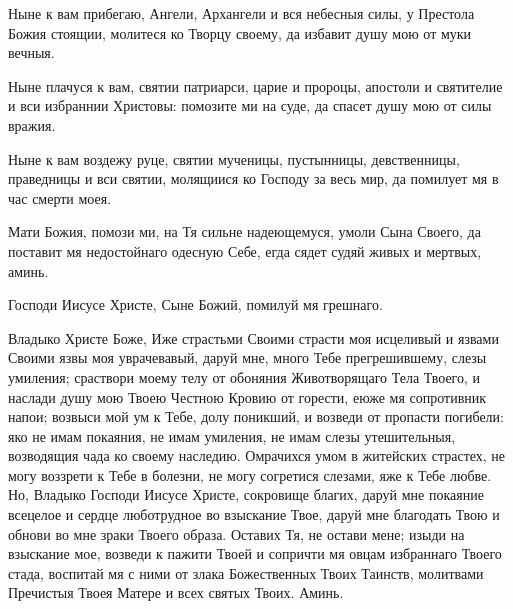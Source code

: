 \begin{mymulticols}

Ныне к вам прибегаю, Ангели, Архангели и вся небесныя силы, у Престола Божия стоящии, молитеся ко Творцу своему, да избавит душу мою от муки вечныя.


Ныне плачуся к вам, святии патриарси, царие и пророцы, апостоли и святителие и вси избраннии Христовы: помозите ми на суде, да спасет душу мою от силы вражия.

\slava

Ныне к вам воздежу руце, святии мученицы, пустынницы, девственницы, праведницы и вси святии, молящиися ко Господу за весь мир, да помилует мя в час смерти моея.

\inyne

Мати Божия, помози ми, на Тя сильне надеющемуся, умоли Сына Своего, да поставит мя недостойнаго одесную Себе, егда сядет судяй живых и мертвых, аминь.


Господи Иисусе Христе, Сыне Божий, помилуй мя грешнаго.

Владыко Христе Боже, Иже страстьми Своими страсти моя исцеливый и язвами Своими язвы моя уврачевавый, даруй мне, много Тебе прегрешившему, слезы умиления; сраствори моему телу от обоняния Животворящаго Тела Твоего, и наслади душу мою Твоею Честною Кровию от горести, еюже мя сопротивник напои; возвыси мой ум к Тебе, долу поникший, и возведи от пропасти погибели: яко не имам покаяния, не имам умиления, не имам слезы утешительныя, возводящия чада ко своему наследию. Омрачихся умом в житейских страстех, не могу воззрети к Тебе в болезни, не могу согретися слезами, яже к Тебе любве. Но, Владыко Господи Иисусе Христе, сокровище благих, даруй мне покаяние всецелое и сердце люботрудное во взыскание Твое, даруй мне благодать Твою и обнови во мне зраки Твоего образа. Оставих Тя, не остави мене; изыди на взыскание мое, возведи к пажити Твоей и сопричти мя овцам избраннаго Твоего стада, воспитай мя с ними от злака Божественных Твоих Таинств, молитвами Пречистыя Твоея Матере и всех святых Твоих. Аминь.

\end{mymulticols}

\mychapterending


